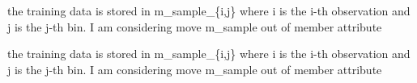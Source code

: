 
\begin{DoxyRefList}
\item[\label{todo__todo000001}%
\hypertarget{todo__todo000001}{}%
Member \hyperlink{classpgpr__data_a569dc41fa124c739d28d05d56874d4c4}{pgpr\+\_\+data\+:\+:get\+Random\+Blk} ()]the training data is stored in m\+\_\+sample\+\_\+\{i,j\} where i is the i-\/th observation and j is the j-\/th bin. I am considering move m\+\_\+sample out of member attribute  
\item[\label{todo__todo000002}%
\hypertarget{todo__todo000002}{}%
Member \hyperlink{classpgpr__data_a1b0b0b000a221c160339ea4207910753}{pgpr\+\_\+data\+:\+:get\+Random\+Walk} ()]the training data is stored in m\+\_\+sample\+\_\+\{i,j\} where i is the i-\/th observation and j is the j-\/th bin. I am considering move m\+\_\+sample out of member attribute 
\end{DoxyRefList}